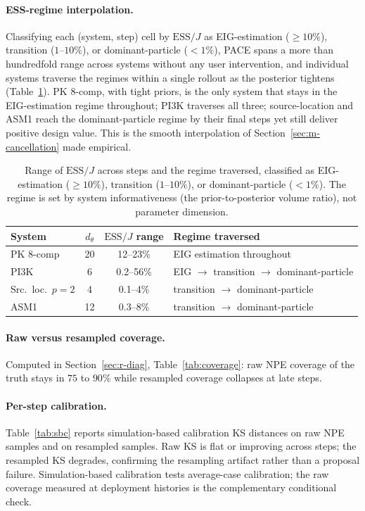\paragraph{ESS-regime interpolation.}
Classifying each (system, step) cell by $\mathrm{ESS}/J$ as EIG-estimation
($\ge10\%$), transition ($1$--$10\%$), or dominant-particle ($<1\%$),
PACE spans a more than hundredfold range across systems without any user intervention,
and individual systems traverse the regimes within a single rollout as the posterior
tightens (Table~\ref{tab:ess-regime}). PK 8-comp, with tight priors, is the only system
that stays in the EIG-estimation regime throughout; PI3K traverses all three;
source-location and ASM1 reach the dominant-particle regime by their final steps yet
still deliver positive design value. This is the smooth interpolation of
Section~\ref{sec:m-cancellation} made empirical.

\begin{table}[h]
\centering\small
\caption[ESS regimes]{Range of $\mathrm{ESS}/J$ across steps and the regime traversed,
classified as EIG-estimation ($\ge10\%$), transition ($1$--$10\%$), or
dominant-particle ($<1\%$). The regime is set by system informativeness (the
prior-to-posterior volume ratio), not parameter dimension.}
\label{tab:ess-regime}
\begin{tabular}{lccl}
\toprule
System & $d_\theta$ & $\mathrm{ESS}/J$ range & Regime traversed \\
\midrule
PK 8-comp & 20 & 12--23\% & EIG estimation throughout \\
PI3K & 6 & 0.2--56\% & EIG $\to$ transition $\to$ dominant-particle \\
Src.\ loc.\ $p{=}2$ & 4 & 0.1--4\% & transition $\to$ dominant-particle \\
ASM1 & 12 & 0.3--8\% & transition $\to$ dominant-particle \\
\bottomrule
\end{tabular}
\end{table}

\paragraph{Raw versus resampled coverage.}
Computed in Section~\ref{sec:r-diag}, Table~\ref{tab:coverage}: raw NPE coverage of
the truth stays in $75$ to $90\%$ while resampled coverage collapses at late steps.

\paragraph{Per-step calibration.}
Table~\ref{tab:sbc} reports simulation-based calibration KS distances on raw NPE
samples and on resampled samples. Raw KS is flat or improving across steps; the
resampled KS degrades, confirming the resampling artifact rather than a proposal
failure. Simulation-based calibration tests average-case calibration; the raw
coverage measured at deployment histories is the complementary conditional check.

